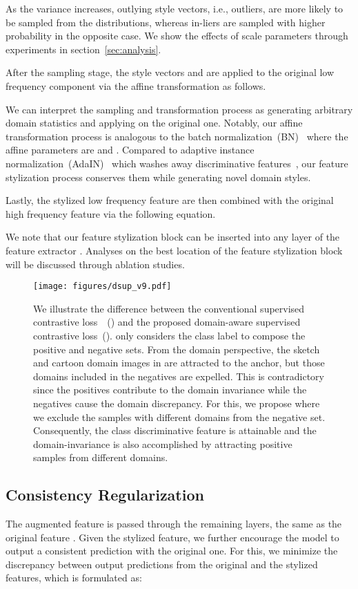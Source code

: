 \documentclass[sigconf]{acmart}
\begin{document}
As the variance increases, outlying style vectors, i.e., outliers, are more likely to be sampled from the distributions, whereas in-liers are sampled with higher probability in the opposite case. We show the effects of scale parameters through experiments in section~\ref{sec:analysis}.

After the sampling stage, the style vectors  and  are applied to the original low frequency component  via the affine transformation as follows.


We can interpret the sampling and transformation process as generating arbitrary domain statistics and applying on the original one. Notably, our affine transformation process is analogous to the batch normalization~(BN)~\cite{ioffe2015batch} where the affine parameters are  and . Compared to adaptive instance normalization~(AdaIN)~\cite{huang2017arbitrary} which washes away discriminative features~\cite{nam2018batch, Seo2020LearningTO}, our feature stylization process conserves them while generating novel domain styles.

Lastly, the stylized low frequency feature  are then combined with the original high frequency feature  via the following equation.


We note that our feature stylization block can be inserted into any layer of the feature extractor . Analyses on the best location  of the feature stylization block will be discussed through ablation studies.

\begin{figure*}
  \texttt{[image: figures/dsup\_v9.pdf]}
  \caption{We illustrate the difference between the conventional supervised contrastive loss~\cite{khosla2020supervised}~() and the proposed domain-aware supervised contrastive loss~().  only considers the class label to compose the positive and negative sets. From the domain perspective, the sketch and cartoon domain images in  are attracted to the anchor, but those domains included in the negatives are expelled. This is contradictory since the positives contribute to the domain invariance while the negatives cause the domain discrepancy. For this, we propose  where we exclude the samples with different domains from the negative set. Consequently, the class discriminative feature is attainable and the domain-invariance is also accomplished by attracting positive samples from different domains.
  }
  \label{fig:dsup}
\end{figure*}

\subsection{Consistency Regularization}
The augmented feature  is passed through the remaining layers, the same as the original feature .
Given the stylized feature, we further encourage the model to output a consistent prediction with the original one.
For this, we minimize the discrepancy between output predictions from the original and the stylized features, which is formulated as:
\end{document}
